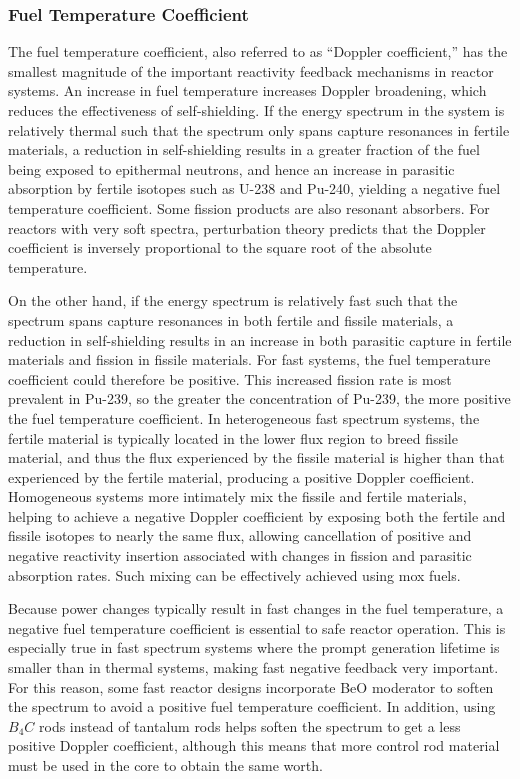 \subsubsection{Fuel Temperature Coefficient}
The fuel temperature coefficient, also referred to as ``Doppler coefficient,'' has the smallest magnitude of the important reactivity feedback mechanisms in reactor systems. An increase in fuel temperature increases Doppler broadening, which reduces the effectiveness of self-shielding. If the energy spectrum in the system is relatively thermal such that the spectrum only spans capture resonances in fertile materials, a reduction in self-shielding results in a greater fraction of the fuel being exposed to epithermal neutrons, and hence an increase in parasitic absorption by fertile isotopes such as U-238 and Pu-240, yielding a negative fuel temperature coefficient. Some fission products are also resonant absorbers. For reactors with very soft spectra, perturbation theory predicts that the Doppler coefficient is inversely proportional to the square root of the absolute temperature.

On the other hand, if the energy spectrum is relatively fast such that the spectrum spans capture resonances in both fertile and fissile materials, a reduction in self-shielding results in an increase in both parasitic capture in fertile materials and fission in fissile materials. For fast systems, the fuel temperature coefficient could therefore be positive. This increased fission rate is most prevalent in Pu-239, so the greater the concentration of Pu-239, the more positive the fuel temperature coefficient. In heterogeneous fast spectrum systems, the fertile material is typically located in the lower flux region to breed fissile material, and thus the flux experienced by the fissile material is higher than that experienced by the fertile material, producing a positive Doppler coefficient. Homogeneous systems more intimately mix the fissile and fertile materials, helping to achieve a negative Doppler coefficient by exposing both the fertile and fissile isotopes to nearly the same flux, allowing cancellation of positive and negative reactivity insertion associated with changes in fission and parasitic absorption rates. Such mixing can be effectively achieved using \gls{mox} fuels. 

Because power changes typically result in fast changes in the fuel temperature, a negative fuel temperature coefficient is essential to safe reactor operation. This is especially true in fast spectrum systems where the prompt generation lifetime is smaller than in thermal systems, making fast negative feedback very important. For this reason, some fast reactor designs incorporate BeO moderator to soften the spectrum to avoid a positive fuel temperature coefficient. In addition, using \(B_4C\) rods instead of tantalum rods helps soften the spectrum to get a less positive Doppler coefficient, although this means that more control rod material must be used in the core to obtain the same worth. 

